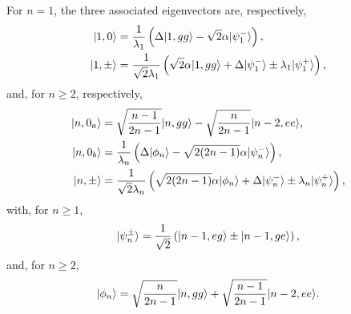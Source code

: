 For $n=1$, the three associated eigenvectors are, respectively,
\begin{align}
    | 1,0 \rangle   & = \frac{1}{\lambda_1} \left( \Delta | 1,gg \rangle  - \sqrt{2} \alpha | \psi^-_1 \rangle \right),                                     \\
    | 1,\pm \rangle & = \frac{1}{\sqrt{2} \lambda_1} \left(\sqrt 2 \alpha | 1,gg \rangle + \Delta | \psi^-_1 \rangle \pm \lambda_1 | \psi^+_1 \rangle \right) ,
\end{align}
and, for $n \geq 2$, respectively,
\begin{align}
    | n,0_a \rangle & = \sqrt{\frac{n-1}{2n-1}} | n,gg \rangle - \sqrt{\frac{n}{2n-1}} | n-2,ee \rangle,                                                              \\
    | n,0_b \rangle & = \frac{1}{\lambda_n} \left( \Delta | \phi_n \rangle  - \sqrt{2(2n-1)} \alpha | \psi^-_n \rangle \right),                                       \\
    | n,\pm \rangle & =  \frac{1}{\sqrt 2 \lambda_n} \left( \sqrt{2(2n-1)} \alpha | \phi_n \rangle +  \Delta | \psi^-_n \rangle \pm \lambda_n | \psi^+_n \rangle \right),
\end{align}
with, for $n \geq 1$,
\begin{equation}
    | \psi^{\pm}_n \rangle = \frac{1}{\sqrt{2}} \left( | n-1,eg \rangle \pm | n-1,ge \rangle \right),
\end{equation}
and, for $n \geq 2$,
\begin{equation}
    | \phi_n \rangle = \sqrt{\frac{n}{2n-1}} | n,gg \rangle +\sqrt{\frac{n-1}{2n-1}} | n-2,ee \rangle. \\
\end{equation}

